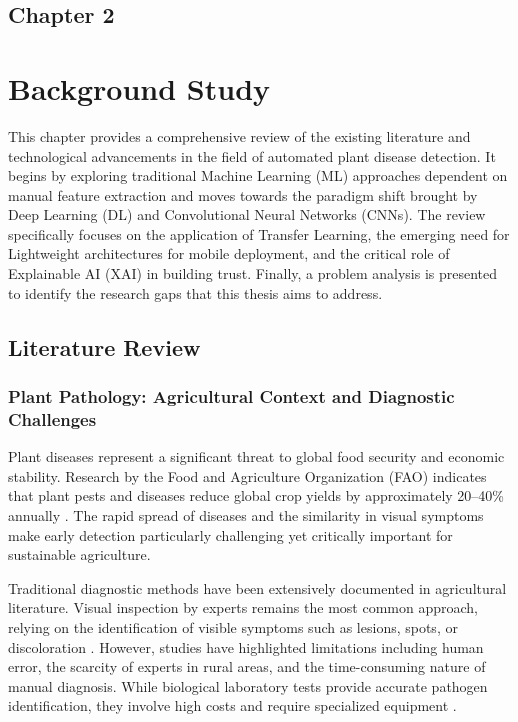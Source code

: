 \begin{center}
    \section*{\fontsize{20}{20}\selectfont Chapter 2}
\end{center}
\vspace{10mm}
\section{Background Study}

This chapter provides a comprehensive review of the existing literature and technological advancements in the field of automated plant disease detection. It begins by exploring traditional Machine Learning (ML) approaches dependent on manual feature extraction and moves towards the paradigm shift brought by Deep Learning (DL) and Convolutional Neural Networks (CNNs). The review specifically focuses on the application of Transfer Learning, the emerging need for Lightweight architectures for mobile deployment, and the critical role of Explainable AI (XAI) in building trust. Finally, a problem analysis is presented to identify the research gaps that this thesis aims to address.

\subsection{Literature Review}

\subsubsection{Plant Pathology: Agricultural Context and Diagnostic Challenges}
Plant diseases represent a significant threat to global food security and economic stability. Research by the Food and Agriculture Organization (FAO) indicates that plant pests and diseases reduce global crop yields by approximately 20--40\% annually \cite{strange2005plant}. The rapid spread of diseases and the similarity in visual symptoms make early detection particularly challenging yet critically important for sustainable agriculture.

Traditional diagnostic methods have been extensively documented in agricultural literature. Visual inspection by experts remains the most common approach, relying on the identification of visible symptoms such as lesions, spots, or discoloration \cite{barbedo2018factors}. However, studies have highlighted limitations including human error, the scarcity of experts in rural areas, and the time-consuming nature of manual diagnosis. While biological laboratory tests provide accurate pathogen identification, they involve high costs and require specialized equipment \cite{fao2017future}.

